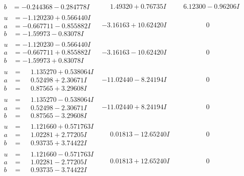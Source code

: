 \documentclass[1p]{elsarticle_modified}
\theoremstyle{definition}
\begin{document}
$$\begin{array}{c|c|c}
\begin{aligned}
b &= -0.244368 - 0.284778 I\end{aligned}
 & \phantom{-}1.49320 + 0.76735 I & \phantom{-}6.12300 - 0.96206 I \\ \hline\begin{aligned}
u &= -1.120230 + 0.566440 I \\
a &= -0.667711 - 0.855882 I \\
b &= -1.59973 - 0.83078 I\end{aligned}
 & -3.16163 + 10.62420 I & \phantom{-0.000000 } 0 \\ \hline\begin{aligned}
u &= -1.120230 - 0.566440 I \\
a &= -0.667711 + 0.855882 I \\
b &= -1.59973 + 0.83078 I\end{aligned}
 & -3.16163 - 10.62420 I & \phantom{-0.000000 } 0 \\ \hline\begin{aligned}
u &= \phantom{-}1.135270 + 0.538064 I \\
a &= \phantom{-}0.52498 + 2.30671 I \\
b &= \phantom{-}0.87565 + 3.29608 I\end{aligned}
 & -11.02440 - 8.24194 I & \phantom{-0.000000 } 0 \\ \hline\begin{aligned}
u &= \phantom{-}1.135270 - 0.538064 I \\
a &= \phantom{-}0.52498 - 2.30671 I \\
b &= \phantom{-}0.87565 - 3.29608 I\end{aligned}
 & -11.02440 + 8.24194 I & \phantom{-0.000000 } 0 \\ \hline\begin{aligned}
u &= \phantom{-}1.121660 + 0.571763 I \\
a &= \phantom{-}1.02281 + 2.77205 I \\
b &= \phantom{-}0.93735 + 3.74422 I\end{aligned}
 & \phantom{-}0.01813 - 12.65240 I & \phantom{-0.000000 } 0 \\ \hline\begin{aligned}
u &= \phantom{-}1.121660 - 0.571763 I \\
a &= \phantom{-}1.02281 - 2.77205 I \\
b &= \phantom{-}0.93735 - 3.74422 I\end{aligned}
 & \phantom{-}0.01813 + 12.65240 I & \phantom{-0.000000 } 0 \\ \hline\begin{aligned}

\end{aligned}
\end{array}$$
\end{document}
